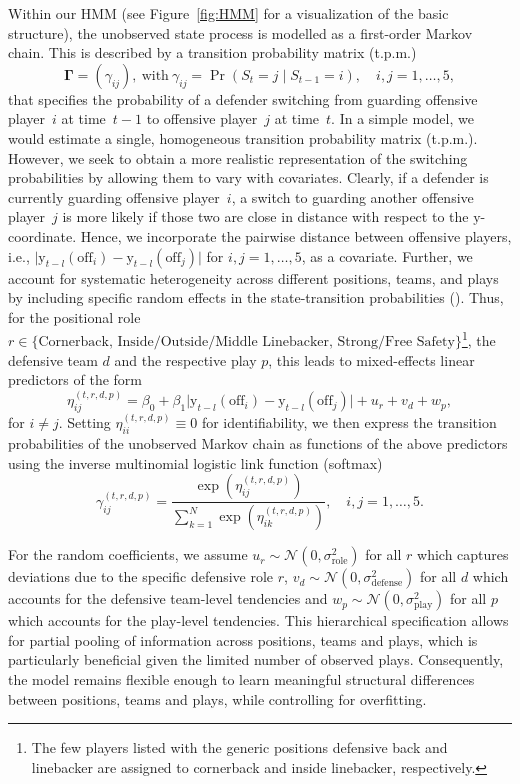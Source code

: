 \documentclass[namedate,webpdf,modern,medium]{oup-authoring-template}
\begin{document}
Within our HMM (see Figure~\ref{fig:HMM} for a visualization of the basic structure), the unobserved state process is modelled as a first-order Markov chain. This is described by 
a transition probability matrix (t.p.m.) 
$$\boldsymbol{\Gamma} = (\gamma_{ij}),\ \text{with} \  \gamma_{ij} = \Pr(S_t = j \mid S_{t-1} = i), \quad i,j = 1, \ldots, 5,$$
that specifies the probability of a defender switching from guarding offensive player~$i$ at time~$t-1$ to offensive player~$j$ at time~$t$.
In a simple model, we would estimate a single, homogeneous transition probability matrix (t.p.m.). However, we seek to obtain a more realistic representation of the switching probabilities by allowing them to vary with covariates. 
Clearly, if a defender is currently guarding offensive player~$i$, a switch to guarding another offensive player~$j$ is more likely if those two are close in distance with respect to the $\mathrm{y}$-coordinate. Hence, we incorporate the pairwise distance between offensive players, i.e., $\vert \mathrm{y}_{t-l}(\text{off}_i) - \mathrm{y}_{t-l}(\text{off}_j) \vert$ for $i,j = 1, \ldots, 5$, as a covariate.
Further, we account for systematic heterogeneity across different positions, teams, and plays by including specific random effects in the state-transition probabilities (\citealp{maruotti2009semiparametric}). Thus, for the positional role $r \in \{\text{Cornerback, Inside/Outside/Middle Linebacker, Strong/Free Safety}\}$\footnote{The few players listed with the generic positions defensive back and linebacker are assigned to cornerback and inside linebacker, respectively.}, the defensive team $d$ and the respective play $p$, this leads to mixed-effects linear predictors of the form
\begin{equation}\label{eq:re}    
\eta_{ij}^{(t,r,d,p)} = \beta_0 + \beta_1 \vert \mathrm{y}_{t-l}(\text{off}_i) -  \mathrm{y}_{t-l}(\text{off}_j) \vert + u_{r} + v_{d} + w_p,
\end{equation}
for $i \neq j$. Setting $\eta_{ii}^{(t,r,d,p)} \equiv 0$ for identifiability, we then express the transition probabilities of the unobserved Markov chain as functions of the above predictors using the inverse multinomial logistic link function (softmax)
$$
\gamma_{ij}^{(t,r,d,p)} = \frac{\exp(\eta_{ij}^{(t,r,d,p)})}{\sum_{k=1}^N \exp(\eta_{ik}^{(t,r,d,p)})}, \quad i, j = 1, \dotsc, 5.
$$

For the random coefficients, we assume
$u_r \sim \mathcal{N}(0, \sigma_{\text{role}}^2)$ for all $r$ which captures deviations due to the specific defensive role $r$, $v_d \sim \mathcal{N}(0, \sigma_{\text{defense}}^2)$ for all $d$ which accounts for the defensive team-level tendencies and $w_p \sim \mathcal{N}(0, \sigma_{\text{play}}^2)$ for all $p$ which accounts for the play-level tendencies.
This hierarchical specification allows for partial pooling of information across positions, teams and plays, which is particularly beneficial given the limited number of observed plays. Consequently, the model remains flexible enough to learn meaningful structural differences between positions, teams and plays, while controlling for overfitting.
\end{document}
